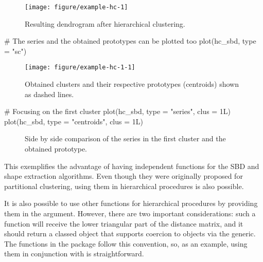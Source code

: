 \begin{figure}[htbp]
	
	{\centering \texttt{[image: figure/example-hc-1]}
		
	}
	
	\caption{Resulting dendrogram after hierarchical clustering.}\label{fig:example-hc}
\end{figure}

\begin{example}
# The series and the obtained prototypes can be plotted too
plot(hc_sbd, type = "sc")
\end{example}

\begin{figure}[htbp]
	
	{\centering \texttt{[image: figure/example-hc-1-1]}
		
	}
	
	\caption{Obtained clusters and their respective prototypes (centroids) shown as dashed lines.}\label{fig:example-hc-1}
\end{figure}

\begin{example}
# Focusing on the first cluster
plot(hc_sbd, type = "series", clus = 1L)
plot(hc_sbd, type = "centroids", clus = 1L)
\end{example}

\begin{figure}[htbp]
	
	{\centering {}
		
	}
	
	\caption{Side by side comparison of the series in the first cluster and the obtained prototype.}\label{fig:example-hc-2}
\end{figure}

\FloatBarrier

This exemplifies the advantage of having independent functions for the SBD and shape extraction algorithms.
Even though they were originally proposed for partitional clustering,
using them in hierarchical procedures is also possible.

It is also possible to use other functions for hierarchical procedures by providing them in the  argument.
However, there are two important considerations:
such a function will receive the lower triangular part of the distance matrix,
and it should return a classed object that supports coercion to  objects via the  generic.
The functions in the  package follow this convention,
so, as an example, using them in conjunction with \dtwclust{} is straightforward.


